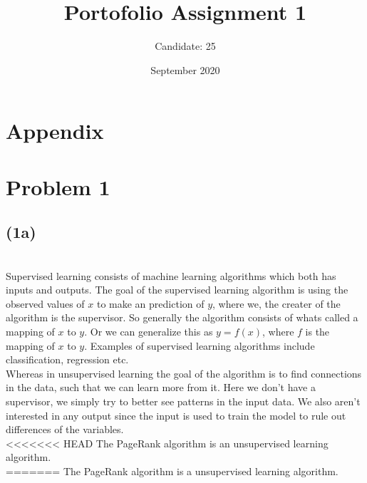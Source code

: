\documentclass[12pt, letterpaper]{article}
\title{Portofolio Assignment 1}
\author{Candidate: 25}
\date{September 2020}
\begin{document}
  \maketitle
  \section*{Appendix}
  \newpage
  \section*{Problem 1}
    \subsection*{(1a)} \\
    Supervised learning consists of machine learning algorithms which both has inputs and outputs. The goal of the supervised learning algorithm is using the observed values of $x$ to make an prediction of $y$, where we, the creater of the algorithm is the supervisor. So generally the algorithm consists of whats called a mapping of $x$ to $y$. Or we can generalize this as $y = f(x)$, where $f$ is the mapping of $x$ to $y$. Examples of supervised learning algorithms include classification, regression etc.\\
    \newline
    Whereas in unsupervised learning the goal of the algorithm is to find connections in the data, such that we can learn more from it. Here we don't have a supervisor, we simply try to better see patterns in the input data. We also aren't interested in any output since the input is used to train the model to rule out differences of the variables.\\
    \newline
<<<<<<< HEAD
    The PageRank algorithm is an unsupervised learning algorithm.\\
=======
    The PageRank algorithm is a unsupervised learning algorithm.

    \newline
\end{document}

